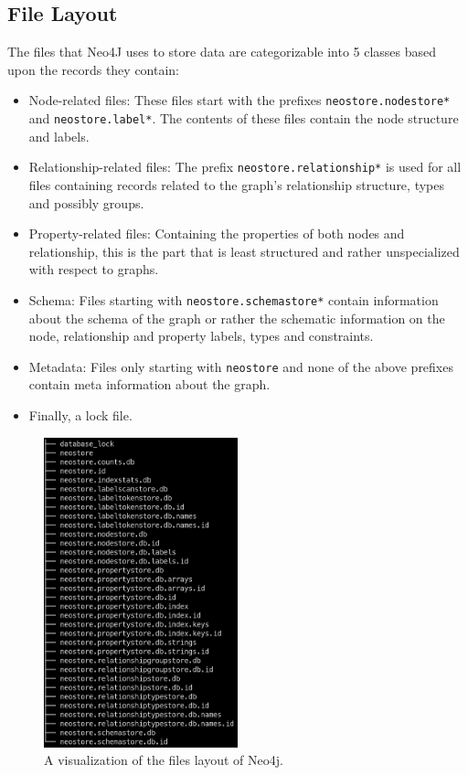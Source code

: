 \documentclass[a4paper,10pt]{article}
\begin{document}
    \subsection{File Layout}\label{files_sec}
        The files that Neo4J uses to store data are categorizable into 5 classes based upon the records they contain:
        \begin{itemize}
            \item Node-related files: These files start with the prefixes \texttt{neostore.nodestore*} and \texttt{neostore.label*}. 
                The contents of these files contain the node structure and labels. 
            \item Relationship-related files: The prefix \texttt{neostore.relationship*} is used for all files containing records related to the graph's relationship structure, types and possibly groups.
            \item Property-related files: Containing the properties of both nodes and relationship, this is the part that is least structured and rather unspecialized with respect to graphs.
            \item Schema: Files starting with \texttt{neostore.schemastore*} contain information about the schema of the graph or rather the schematic information on the node, relationship and property labels, types and constraints.
            \item Metadata: Files only starting with \texttt{neostore} and none of the above prefixes contain meta information about the graph.
            \item Finally, a lock file.
        \end{itemize}
        
        \begin{figure}[htp]\label{files}
            \begin{center}
                \includegraphics[keepaspectratio,height=0.4\textheight,width=0.5\textwidth]{img/03_record/files.png}
            \end{center}
            \caption{A visualization of the files layout of Neo4j.} 
        \end{figure}
\end{document}
